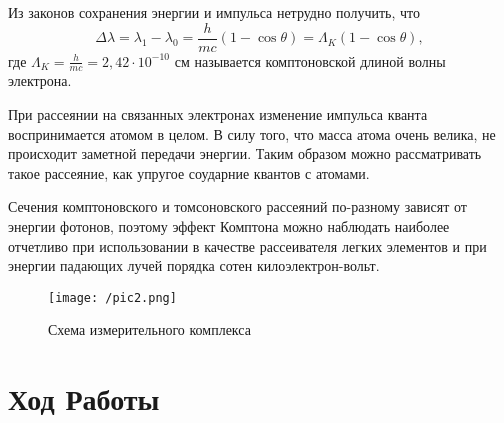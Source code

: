 \documentclass[a4paper,12pt]{article}
\theoremstyle{plain} %
\theoremstyle{definition} %
\theoremstyle{remark} %
\begin{document}
\begin{minipage}{0.45\textwidth}
Из законов сохранения энергии и импульса нетрудно получить, что 
\[\Delta \lambda = \lambda_1 - \lambda_0 = \frac{h}{mc}(1 - \cos\theta) = \Lambda_K(1 - \cos\theta),\]
где $\Lambda_K = \frac{h}{mc} = 2,42\cdot10^{-10}\text{ см}$ называется комптоновской длиной волны электрона.\par
  
При рассеянии на связанных электронах изменение импульса кванта воспринимается атомом в целом. В силу того, что масса атома очень велика, не происходит заметной передачи энергии. Таким образом можно рассматривать такое рассеяние, как упругое соударние квантов с атомами. \par
Сечения комптоновского и томсоновского рассеяний по-разному зависят от энергии фотонов, поэтому эффект Комптона можно наблюдать наиболее отчетливо при использовании в качестве рассеивателя легких элементов и при энергии падающих лучей порядка сотен килоэлектрон-вольт.

\begin{figure}[H]
        \texttt{[image: /pic2.png]}
    \caption{Схема измерительного комплекса}
\end{figure}
\end{minipage}


\section{Ход Работы}
\end{document}
